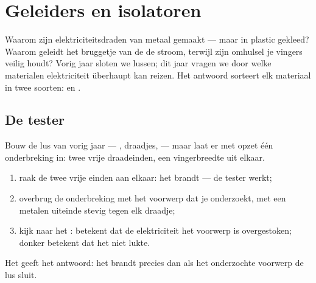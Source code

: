 \chapter{Geleiders en isolatoren}\label{ch:g4:conductors-insulators}

Waarom zijn elektriciteitsdraden van metaal gemaakt --- maar in
plastic gekleed? Waarom geleidt het bruggetje van de  de
stroom, terwijl zijn omhulsel je vingers veilig houdt? Vorig jaar
sloten we lussen; dit jaar vragen we door welke materialen
elektriciteit überhaupt kan reizen. Het antwoord sorteert elk
materiaal in twee soorten:  en .

\section{De tester}

\begin{method}\label{met:g4:conductors-insulators:tester}
Bouw de lus van vorig jaar --- , draadjes,  --- maar
laat er met opzet één onderbreking in: twee vrije draadeinden, een
vingerbreedte uit elkaar.
\begin{enumerate}
  \item raak de twee vrije einden aan elkaar: het  brandt ---
        de tester werkt;
  \item overbrug de onderbreking met het voorwerp dat je onderzoekt,
        met een metalen uiteinde stevig tegen elk draadje;
  \item kijk naar het :  betekent dat de elektriciteit
        het voorwerp is overgestoken; donker betekent dat het niet
        lukte.
\end{enumerate}
Het  geeft het antwoord: het brandt precies dan als het
onderzochte voorwerp de lus sluit.
\end{method}

